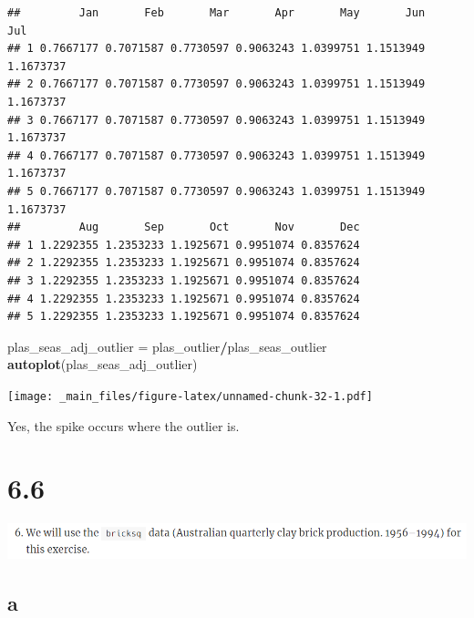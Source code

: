 \documentclass[]{book}
\newenvironment{Shaded}{\begin{snugshade}}{\end{snugshade}}
\newcommand{\DataTypeTok}[1]{\textcolor[rgb]{0.13,0.29,0.53}{#1}}
\newcommand{\KeywordTok}[1]{\textcolor[rgb]{0.13,0.29,0.53}{\textbf{#1}}}
\newcommand{\NormalTok}[1]{#1}
\newcommand{\OperatorTok}[1]{\textcolor[rgb]{0.81,0.36,0.00}{\textbf{#1}}}
\newcommand{\StringTok}[1]{\textcolor[rgb]{0.31,0.60,0.02}{#1}}
\begin{document}
\begin{Shaded}
\end{Shaded}

\begin{verbatim}
##         Jan       Feb       Mar       Apr       May       Jun       Jul
## 1 0.7667177 0.7071587 0.7730597 0.9063243 1.0399751 1.1513949 1.1673737
## 2 0.7667177 0.7071587 0.7730597 0.9063243 1.0399751 1.1513949 1.1673737
## 3 0.7667177 0.7071587 0.7730597 0.9063243 1.0399751 1.1513949 1.1673737
## 4 0.7667177 0.7071587 0.7730597 0.9063243 1.0399751 1.1513949 1.1673737
## 5 0.7667177 0.7071587 0.7730597 0.9063243 1.0399751 1.1513949 1.1673737
##         Aug       Sep       Oct       Nov       Dec
## 1 1.2292355 1.2353233 1.1925671 0.9951074 0.8357624
## 2 1.2292355 1.2353233 1.1925671 0.9951074 0.8357624
## 3 1.2292355 1.2353233 1.1925671 0.9951074 0.8357624
## 4 1.2292355 1.2353233 1.1925671 0.9951074 0.8357624
## 5 1.2292355 1.2353233 1.1925671 0.9951074 0.8357624
\end{verbatim}

\begin{Shaded}
\begin{Highlighting}[]
\NormalTok{plas_seas_adj_outlier =}\StringTok{ }\NormalTok{plas_outlier}\OperatorTok{/}\NormalTok{plas_seas_outlier}
\KeywordTok{autoplot}\NormalTok{(plas_seas_adj_outlier)}
\end{Highlighting}
\end{Shaded}

\texttt{[image: \_main\_files/figure-latex/unnamed-chunk-32-1.pdf]}

Yes, the spike occurs where the outlier is.

\hypertarget{section-6}{%
\section{6.6}\label{section-6}}

\includegraphics{./week2/6.6.png}

\hypertarget{a-3}{%
\subsection{a}\label{a-3}}
\end{document}

